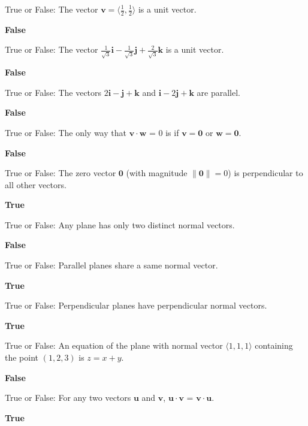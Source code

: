 \documentclass{exam}
\newcommand{\bi}{\mathbf{i}}
\newcommand{\bj}{\mathbf{j}}
\newcommand{\bk}{\mathbf{k}}
\newcommand{\bu}{\mathbf{u}}
\newcommand{\bv}{\mathbf{v}}
\newcommand{\bw}{\mathbf{w}}
\newcommand{\bzero}{\mathbf{0}}
\begin{document}
\begin{questions}
		\question True or False: The vector $\bv=\langle \frac{1}{2}, \frac{1}{2}\rangle$ is a unit vector.
		 \begin{solution}
		 	\textbf{False}
		 \end{solution}
		  
		\question True or False:  The vector $\frac{1}{\sqrt{3}}\bi -\frac{1}{\sqrt{3}}\bj+\frac{2}{\sqrt{3}}\bk$ is a unit vector.
		 \begin{solution}
		 	\textbf{False}
		 \end{solution}
		  
		\question True or False: The vectors $2\bi-\bj+\bk$ and $\bi-2\bj+\bk$ are parallel.
		 \begin{solution}
		 	\textbf{False}
		 \end{solution}
		  
		\question True or False: The only way that $\bv\cdot\bw$ = 0 is if $\bv = \bzero$ or $\bw = \bzero$.
		 \begin{solution}
		 	\textbf{False}
		 \end{solution}
		  
		\question True or False: The zero vector $\bzero$ (with magnitude $\|\bzero\|=0$) is perpendicular to all other vectors.
		 \begin{solution}
		 	\textbf{True}
		 \end{solution}
		  
		\question True or False: Any plane has only two distinct normal vectors.
		 \begin{solution}
		 	\textbf{False}
		 \end{solution}
		  
		\question True or False: Parallel planes share a same normal vector.
		 \begin{solution}
		 	\textbf{True}
		 \end{solution}
		  
		\question True or False: Perpendicular planes have perpendicular normal vectors.
		 \begin{solution}
		 	\textbf{True}
		 \end{solution}
		  
		\question True or False: An equation of the plane with normal vector $\langle 1,1,1\rangle$ containing the point $(1, 2, 3)$ is $z = x + y$.
		 \begin{solution}
		 	\textbf{False}
		 \end{solution}
		  
		\question True or False: For any two vectors $\bu$ and $\bv$, $\bu\cdot\bv$ = $\bv\cdot\bu$.
		 \begin{solution}
		 	\textbf{True}
		 \end{solution}
		

\end{questions}
\end{document}
